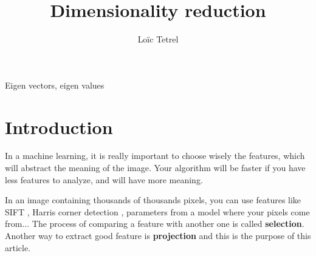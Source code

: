 \documentclass[runningheads,a4paper]{llncs}
\newcommand{\keywords}[1]{\par\addvspace\baselineskip
	\noindent\keywordname\enspace\ignorespaces#1}
\begin{document}
	
	\mainmatter  %
	
	\title{Dimensionality reduction}
	
	
	\author{Loïc Tetrel}
	
	\institute{}
	
	
	
	\maketitle

	\keywords{Eigen vectors, eigen values}

	\section{Introduction}\label{introduction}
	In a machine learning, it is really important to choose wisely the features, which will abstract the meaning of the image. Your algorithm will be faster if you have less features to analyze, and will have more meaning.
	\par In an image containing thousands of thousands pixels, you can use features like SIFT \cite{lowe1999object}, Harris corner detection \cite{harris1988combined}, parameters from a model where your pixels come from... The process of comparing a feature with another one is called \textbf{selection}. Another way to extract good feature is \textbf{projection} and this is the purpose of this article.
\end{document}
